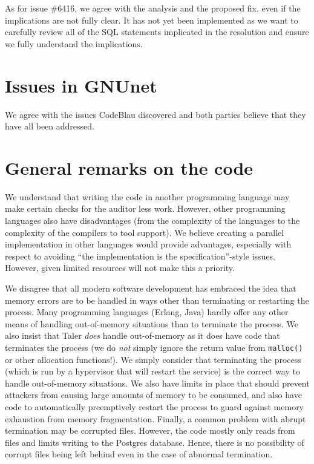 \documentclass[11pt]{article}
\begin{document}
As for issue \#6416, we agree with the analysis and the proposed fix, even if
the implications are not fully clear. It has not yet been implemented as we
want to carefully review all of the SQL statements implicated in the
resolution and ensure we fully understand the implications.

\section{Issues in GNUnet}

We agree with the issues CodeBlau discovered and both parties believe that
they have all been addressed.

\section{General remarks on the code}

We understand that writing the code in another programming language may make
certain checks for the auditor less work. However, other programming languages
also have disadvantages (from the complexity of the languages to the
complexity of the compilers to tool support).  We believe creating a parallel
implementation in other languages would provide advantages, especially with
respect to avoiding ``the implementation is the specification''-style issues.
However, given limited resources will not make this a priority.

We disagree that all modern software development has embraced the idea that
memory errors are to be handled in ways other than terminating or restarting
the process. Many programming languages (Erlang, Java) hardly offer any other
means of handling out-of-memory situations than to terminate the process. We
also insist that Taler {\em does} handle out-of-memory as it does have code
that terminates the process (we do {\em not} simply ignore the return value
from {\tt malloc()} or other allocation functions!). We simply consider that
terminating the process (which is run by a hypervisor that will restart the
service) is the correct way to handle out-of-memory situations.  We also have
limits in place that should prevent attackers from causing large amounts of
memory to be consumed, and also have code to automatically preemptively
restart the process to guard against memory exhaustion from memory
fragmentation.  Finally, a common problem with abrupt termination may be
corrupted files.  However, the code mostly only reads from files and limits
writing to the Postgres database. Hence, there is no possibility of corrupt
files being left behind even in the case of abnormal termination.
\end{document}
